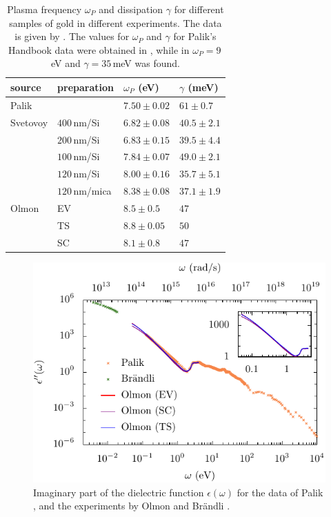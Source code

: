\documentclass[twocolumn,superscriptaddress,pre]{revtex4-1}
\begin{document}
\begin{table}
\begin{center}
\begin{tabular}{|ll|l|l|}
\hline
source & preparation & $\omega_P$ (eV) & $\gamma$ (meV) \\
\hline
\hline
Palik \cite{Palik1995,Pirozhenko2006} & & $7.50\pm0.02$ & $61\pm0.7$ \\
\hline
Svetovoy \cite{Svetovoy2008} & $400\,$nm/Si & $6.82\pm0.08$ & $40.5\pm2.1$ \\
                             & $200\,$nm/Si & $6.83\pm0.15$ & $39.5\pm4.4$ \\
                             & $100\,$nm/Si & $7.84\pm0.07$ & $49.0\pm2.1$ \\
                             & $120\,$nm/Si & $8.00\pm0.16$ & $35.7\pm5.1$ \\
                             & $120\,$nm/mica & $8.38\pm0.08$ & $37.1\pm1.9$ \\
\hline
Olmon \cite{Olmon2012} & EV & $8.5\pm0.5$ & $47$ \\
                       & TS & $8.8\pm0.05$ & $50$ \\
                       & SC & $8.1\pm0.8$ & $47$ \\
\hline
\end{tabular}
\end{center}
\caption{Plasma frequency $\omega_P$ and dissipation $\gamma$ for
different samples of gold in different experiments. The data is given by
\cite{Palik1995,Olmon2012,Svetovoy2008}.  The values for $\omega_P$ and
$\gamma$ for Palik's Handbook data were obtained in \cite{Pirozhenko2006},
while in \cite{Lambrecht2000} $\omega_P=9\,$eV and $\gamma=35\,$meV was found.}
\label{tab:gold}
\end{table}

\begin{figure}
\includegraphics[width=0.95\columnwidth]{img/eps.pdf}
\caption{Imaginary part of the dielectric function $\epsilon(\omega)$ for the
data of Palik \cite{Palik1995}, and the experiments by Olmon \cite{Olmon2012}
and Br\"andli \cite{Brandli1972}.}
\label{fig:eps}
\end{figure}
\end{document}
